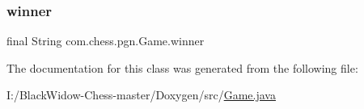 \subsubsection{\texorpdfstring{winner}{winner}}
{\footnotesize\ttfamily final String com.\+chess.\+pgn.\+Game.\+winner\hspace{0.3cm}{\ttfamily [protected]}}



The documentation for this class was generated from the following file\+:\begin{DoxyCompactItemize}
\item 
I\+:/\+Black\+Widow-\/\+Chess-\/master/\+Doxygen/src/\mbox{\hyperlink{_game_8java}{Game.\+java}}\end{DoxyCompactItemize}
